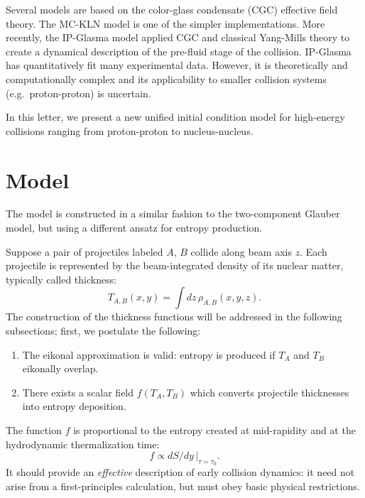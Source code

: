 \documentclass[aps,prl,reprint,amsmath,nofootinbib]{revtex4-1}
\begin{document}
Several models are based on the color-glass condensate (CGC) effective field theory.  The MC-KLN model is one
of the simpler implementations.  More recently, the IP-Glasma model applied CGC and classical Yang-Mills
theory to create a dynamical description of the pre-fluid stage of the collision.  IP-Glasma has
quantitatively fit many experimental data.  However, it is theoretically and computationally complex and its
applicability to smaller collision systems (e.g.~proton-proton) is uncertain.

In this letter, we present a new unified initial condition model for high-energy collisions ranging from
proton-proton to nucleus-nucleus.


\section{Model}

The model is constructed in a similar fashion to the two-component Glauber model, but using a different ansatz
for entropy production.

Suppose a pair of projectiles labeled $A$, $B$ collide along beam axis $z$.  Each projectile is represented by
the beam-integrated density of its nuclear matter, typically called thickness:
\begin{equation}
  T_{A,B}(x, y) = \int dz \, \rho_{A,B}(x, y, z).
\end{equation}
The construction of the thickness functions will be addressed in the following subsections; first, we
postulate the following:
\begin{enumerate}
  \item The eikonal approximation is valid:  entropy is produced if $T_A$ and $T_B$ eikonally overlap.
  \item There exists a scalar field $f(T_A, T_B)$ which converts projectile thicknesses into entropy
    deposition.
\end{enumerate}
The function $f$ is proportional to the entropy created at mid-rapidity and at the hydrodynamic thermalization
time:
\begin{equation}
  f \propto dS/dy \, |_{\tau = \tau_0}.
\end{equation}
It should provide an \emph{effective} description of early collision dynamics:  it need not arise from a
first-principles calculation, but must obey basic physical restrictions.
\end{document}
